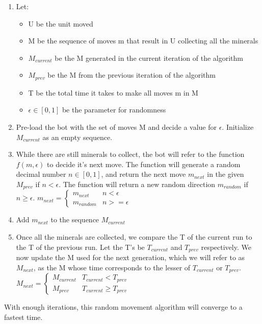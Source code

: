 \documentclass{article}
\begin{document}
	\begin{enumerate}
		\item Let:
		\begin{itemize}
			\item U be the unit moved
			\item M be the sequence of moves m that result in U collecting all the minerals
			\item $M_{current}$ be the M generated in the current iteration of the algorithm
			\item $M_{prev}$ be the M from the previous iteration of the algorithm
			\item T be the total time it takes to make all moves m in M
			\item $\epsilon \in [0, 1]$ be the parameter for randomness
		\end{itemize}
		\item Pre-load the bot with the set of moves M and decide a value for $\epsilon$. Initialize $M_{current}$ as an empty sequence.
		\item While there are still minerals to collect, the bot will refer to the function $f(m, \epsilon)$ to decide it's next move. The function will generate a random decimal number $n \in [0, 1]$, and return the next move $m_{next}$ in the given $M_{prev}$ if $n < \epsilon$. The function will return a new random direction $m_{random}$ if $n \geq \epsilon$.
			\newline
			\newline
			$m_{next} = \begin{cases} 
									m_{next} & n < \epsilon \\
									m_{random} & n >= \epsilon
					   			\end{cases}$
	   		  \newline
	   		  \newline
	   	\item Add $m_{next}$ to the sequence $M_{current}$
	   	\item Once all the minerals are collected, we compare the T of the current run to the T of the previous run. Let the T's be $T_{current}$ and $T_{prev}$ respectively. We now update the M used for the next generation, which we will refer to as $M_{next}$, as the M whose time corresponds to the lesser of $T_{current}$ or $T_{prev}$.
	   		\newline
	   		\newline
	   		  $M_{next} = \begin{cases} 
							   		  M_{current} & T_{current} < T_{prev} \\
							   		  M_{prev} & T_{current} \geq T_{prev}
							   	   \end{cases}$
	\end{enumerate}
	With enough iterations, this random movement algorithm will converge to a fastest time.
\end{document}
